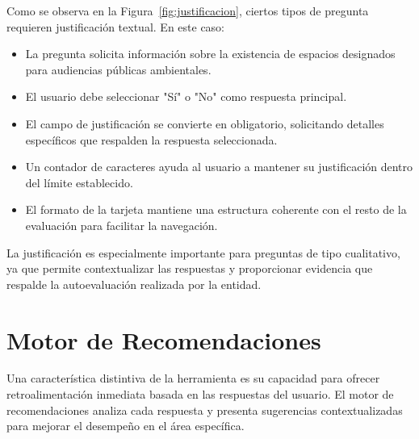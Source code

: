 \documentclass[12pt,a4paper]{report}
\begin{document}
Como se observa en la Figura~\ref{fig:justificacion}, ciertos tipos de pregunta requieren justificación textual. En este caso:
\begin{itemize}[leftmargin=*]
    \item La pregunta solicita información sobre la existencia de espacios designados para audiencias públicas ambientales.
    \item El usuario debe seleccionar "Sí" o "No" como respuesta principal.
    \item El campo de justificación se convierte en obligatorio, solicitando detalles específicos que respalden la respuesta seleccionada.
    \item Un contador de caracteres ayuda al usuario a mantener su justificación dentro del límite establecido.
    \item El formato de la tarjeta mantiene una estructura coherente con el resto de la evaluación para facilitar la navegación.
\end{itemize}

La justificación es especialmente importante para preguntas de tipo cualitativo, ya que permite contextualizar las respuestas y proporcionar evidencia que respalde la autoevaluación realizada por la entidad.

\section{Motor de Recomendaciones}
Una característica distintiva de la herramienta es su capacidad para ofrecer retroalimentación inmediata basada en las respuestas del usuario. El motor de recomendaciones analiza cada respuesta y presenta sugerencias contextualizadas para mejorar el desempeño en el área específica.
\end{document}
